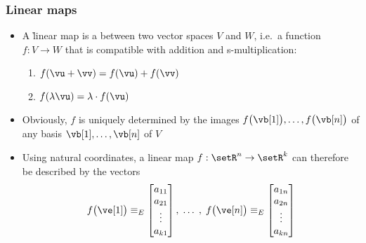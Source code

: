 \begin{frame}
  \frametitle{Linear maps}

  \begin{itemize}
  \item A \h{linear map} is a  between two vector spaces $V$ and
    $W$, i.e.\ a function $f: V\to W$ that is compatible with addition and
    s-multiplication:
    \begin{enumerate}
    \item $f(\vu + \vv) = f(\vu) + f(\vv)$
    \item $f(\lambda \vu) = \lambda \cdot f(\vu)$
    \end{enumerate}
    \pause
  \item Obviously, $f$ is uniquely determined by the images $f\bigl(\vb[1]\bigr), \ldots,
    f\bigl(\vb[n]\bigr)$ of any basis $\vb[1], \ldots, \vb[n]$ of $V$
    \pause
  \item Using natural coordinates, a linear map $f: \setR^n \to \setR^k$ can
    therefore be described by the vectors
    \[
    f\bigl(\ve[1]\bigr) \equiv_E
    \begin{bmatrix}
      a_{11} \\ a_{21} \\ \vdots \\ a_{k1}
    \end{bmatrix}, \;
    \ldots \;,\; 
    f\bigl(\ve[n]\bigr) \equiv_E
    \begin{bmatrix}
      a_{1n} \\ a_{2n} \\ \vdots \\ a_{kn}
    \end{bmatrix}
    \]
  \end{itemize}
\end{frame}


